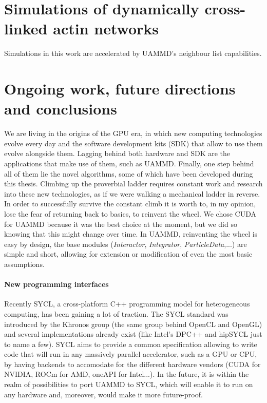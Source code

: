 \documentclass[ twoside,openright,titlepage,numbers=noenddot,%
headinclude,footinclude,cleardoublepage=empty,abstract=on,
BCOR=5mm,paper=a4,fontsize=11pt, dvipsnames
]{scrreprt}
\newcommand{\uammd}{\gls{UAMMD}\xspace}
\begin{document}
\chapter{Simulations of dynamically cross-linked actin networks}
Simulations in this work are accelerated by \uammd's neighbour list capabilities.

\chapter{Ongoing work, future directions and conclusions}\label{ch:conclusions}
We are living in the origins of the GPU era, in which new computing technologies evolve every day and the software development kits (SDK) that allow to use them evolve alongside them. Lagging behind both hardware and SDK are the applications that make use of them, such as UAMMD. Finally, one step behind all of them lie the novel algorithms, some of which have been developed during this thesis. Climbing up the proverbial ladder requires constant work and research into these new technologies, as if we were walking a mechanical ladder in reverse. In order to successfully survive the constant climb it is worth to, in my opinion, lose the fear of returning back to basics, to reinvent the wheel. We chose CUDA for UAMMD because it was the best choice at the moment, but we did so knowing that this might change over time. In UAMMD, reinventing the wheel is easy by design, the base modules (\emph{Interactor}, \emph{Integrator}, \emph{ParticleData},...) are simple and short, allowing for extension or modification of even the most basic assumptions. 

\subsubsection*{New programming interfaces}
Recently SYCL, a cross-platform C++ programming model for heterogeneous computing, has been gaining a lot of traction. The SYCL standard was introduced by the Khronos group (the same group behind OpenCL and OpenGL) and several implementations already exist (like Intel's DPC++ and hipSYCL just to name a few). SYCL aims to provide a common specification allowing to write code that will run in any massively parallel accelerator, such as a GPU or CPU, by having backends to accomodate for the different hardware vendors (CUDA for NVIDIA, ROCm for AMD, oneAPI for Intel...). In the future, it is within the realm of possibilities to port UAMMD to SYCL, which will enable it to run on any hardware and, moreover, would make it more future-proof.
\end{document}
